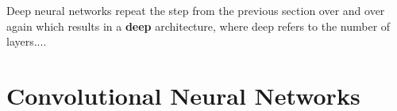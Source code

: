 %
%





Deep neural networks repeat the step from the previous section over and over again which results in a \textbf{deep} architecture, where deep refers to the number of layers....


\section[Convolutional NNs]{Convolutional Neural Networks}
